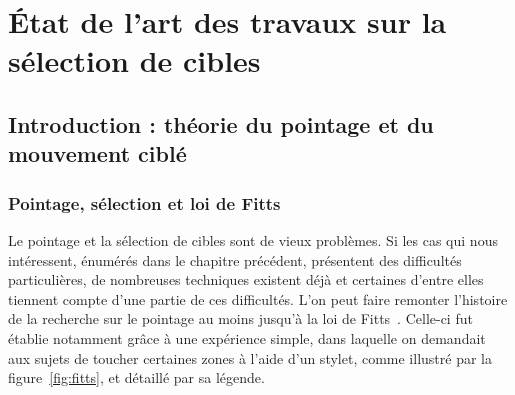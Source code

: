 
\chapter[Sélection de cibles : état de l'art]{État de l'art des travaux sur la sélection de cibles}
\minitoc
\label{chap2}
\cleardoublepage

\section{Introduction : théorie du pointage et du mouvement ciblé}
	\subsection{Pointage, sélection et loi de Fitts}
	Le pointage et la sélection de cibles sont de vieux problèmes. Si les cas qui nous intéressent, énumérés dans le chapitre précédent, présentent des difficultés particulières, de nombreuses techniques existent déjà et certaines d'entre elles tiennent compte d'une partie de ces difficultés. L'on peut faire remonter l'histoire de la recherche sur le pointage au moins jusqu'à la loi de Fitts~\cite{fitts1954information}. Celle-ci fut établie notamment grâce à une expérience simple, dans laquelle on demandait aux sujets de toucher certaines zones à l'aide d'un stylet, comme illustré par la figure~\ref{fig:fitts}, et détaillé par sa légende.
	
